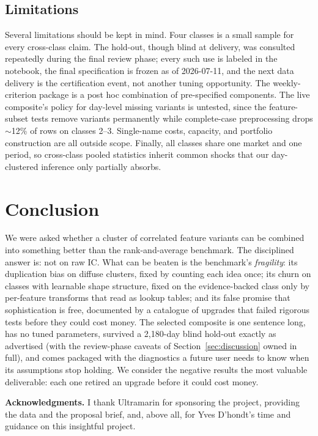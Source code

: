\documentclass[11pt]{article}
\begin{document}
\subsection{Limitations}

Several limitations should be kept in mind. Four classes is a small sample for every
cross-class claim. The hold-out, though blind at delivery, was consulted repeatedly
during the final review phase; every such use is labeled in the notebook, the final
specification is frozen as of 2026-07-11, and the next data delivery is the
certification event, not another tuning opportunity. The weekly-criterion package is a
post hoc combination of pre-specified components. The live composite's policy for
day-level missing variants is untested, since the feature-subset tests remove variants
permanently while complete-case preprocessing drops $\sim$12\% of rows on classes 2--3.
Single-name costs, capacity, and portfolio construction are all outside scope. Finally,
all classes share one market and one period, so cross-class pooled statistics inherit
common shocks that our day-clustered inference only partially absorbs.

\section{Conclusion}
\label{sec:conclusion}

We were asked whether a cluster of correlated feature variants can be combined into
something better than the rank-and-average benchmark. The disciplined answer is: not on
raw IC. What can be beaten is the benchmark's \emph{fragility}: its duplication bias on
diffuse clusters, fixed by counting each idea once; its churn on classes with learnable
shape structure, fixed on the evidence-backed class only by per-feature transforms that
read as lookup tables; and its false promise that sophistication is free, documented by
a catalogue of upgrades that failed rigorous tests before they could cost money. The
selected composite is one sentence long, has no tuned parameters, survived a 2{,}180-day
blind hold-out exactly as advertised (with the review-phase caveats of
Section~\ref{sec:discussion} owned in full), and comes packaged with the diagnostics a
future user needs to know when its assumptions stop holding. We consider the negative
results the most valuable deliverable: each one retired an upgrade before it could cost
money.

\vspace{2ex}
\noindent\textbf{Acknowledgments.} I thank Ultramarin for sponsoring the project,
providing the data and the proposal brief, and, above all, for Yves D'hondt's time and
guidance on this insightful project.
\end{document}
